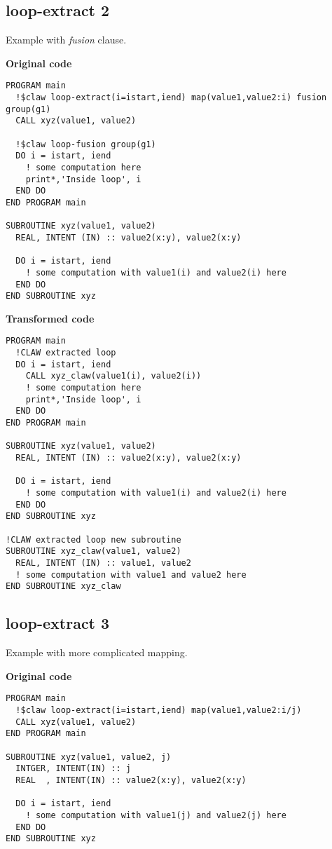 \documentclass{article}
\begin{document}
\subsection{loop-extract 2}
\label{loop-extract2}
Example with \textit{fusion} clause. 

\textbf{Original code}
\begin{lstlisting}
PROGRAM main
  !$claw loop-extract(i=istart,iend) map(value1,value2:i) fusion group(g1)
  CALL xyz(value1, value2)

  !$claw loop-fusion group(g1)
  DO i = istart, iend
    ! some computation here
    print*,'Inside loop', i
  END DO
END PROGRAM main

SUBROUTINE xyz(value1, value2)
  REAL, INTENT (IN) :: value2(x:y), value2(x:y)

  DO i = istart, iend
    ! some computation with value1(i) and value2(i) here
  END DO
END SUBROUTINE xyz
\end{lstlisting}

\textbf{Transformed code}
\begin{lstlisting}
PROGRAM main
  !CLAW extracted loop
  DO i = istart, iend
    CALL xyz_claw(value1(i), value2(i))
    ! some computation here
    print*,'Inside loop', i
  END DO
END PROGRAM main

SUBROUTINE xyz(value1, value2)
  REAL, INTENT (IN) :: value2(x:y), value2(x:y)

  DO i = istart, iend
    ! some computation with value1(i) and value2(i) here
  END DO
END SUBROUTINE xyz

!CLAW extracted loop new subroutine
SUBROUTINE xyz_claw(value1, value2)
  REAL, INTENT (IN) :: value1, value2
  ! some computation with value1 and value2 here
END SUBROUTINE xyz_claw
\end{lstlisting}


\subsection{loop-extract 3}
\label{loop-extract3}
Example with more complicated mapping. 

\textbf{Original code}
\begin{lstlisting}
PROGRAM main
  !$claw loop-extract(i=istart,iend) map(value1,value2:i/j)
  CALL xyz(value1, value2)
END PROGRAM main

SUBROUTINE xyz(value1, value2, j)
  INTGER, INTENT(IN) :: j
  REAL  , INTENT(IN) :: value2(x:y), value2(x:y)

  DO i = istart, iend
    ! some computation with value1(j) and value2(j) here
  END DO
END SUBROUTINE xyz
\end{lstlisting}
\end{document}
